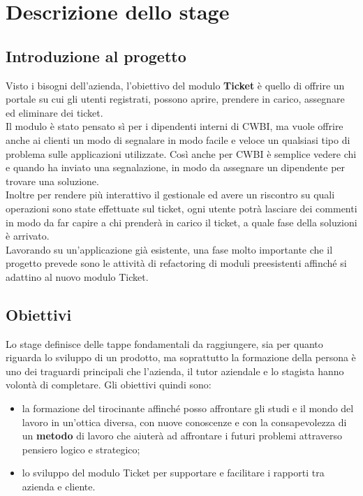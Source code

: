 \chapter{Descrizione dello stage}
\label{cap:descrizione-stage}

\section{Introduzione al progetto}
Visto i bisogni dell'azienda, l'obiettivo del modulo \textbf{Ticket} è quello di offrire un portale su cui gli utenti registrati, possono aprire, prendere in carico, assegnare ed eliminare dei ticket. \\
Il modulo è stato pensato sì per i dipendenti interni di CWBI, ma vuole offrire anche ai clienti un modo di segnalare in modo facile e veloce un qualsiasi tipo di problema sulle applicazioni utilizzate. Così anche per CWBI è semplice vedere chi e quando ha inviato una segnalazione, in modo da assegnare un dipendente per trovare una soluzione.\\ 
Inoltre per rendere più interattivo il gestionale ed avere un riscontro su quali operazioni sono state effettuate sul ticket, ogni utente potrà lasciare dei commenti in modo da far capire a chi prenderà in carico il ticket, a quale fase della soluzioni è arrivato.\\
Lavorando su un'applicazione già esistente, una fase molto importante che il progetto prevede sono le attività di refactoring di moduli preesistenti affinché si adattino al nuovo modulo Ticket. 

\section{Obiettivi}
Lo stage definisce delle tappe fondamentali da raggiungere, sia per quanto riguarda lo sviluppo di un prodotto, ma soprattutto la formazione della persona è uno dei traguardi principali che l'azienda, il tutor aziendale e lo stagista hanno volontà di completare. Gli obiettivi quindi sono:
\begin{itemize}
\item la formazione del tirocinante affinché posso affrontare gli studi e il mondo del lavoro in un'ottica diversa, con nuove conoscenze e con la consapevolezza di un \textbf{metodo} di lavoro che aiuterà ad affrontare i futuri problemi attraverso pensiero logico e strategico;
\item lo sviluppo del modulo Ticket per supportare e facilitare i rapporti tra azienda e cliente.
\end{itemize}

